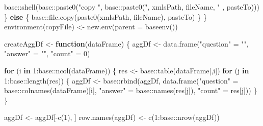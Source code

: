 \documentclass[
]{article}
\newenvironment{Shaded}{\begin{snugshade}}{\end{snugshade}}
\newcommand{\AttributeTok}[1]{\textcolor[rgb]{0.77,0.63,0.00}{#1}}
\newcommand{\ControlFlowTok}[1]{\textcolor[rgb]{0.13,0.29,0.53}{\textbf{#1}}}
\newcommand{\DecValTok}[1]{\textcolor[rgb]{0.00,0.00,0.81}{#1}}
\newcommand{\FunctionTok}[1]{\textcolor[rgb]{0.00,0.00,0.00}{#1}}
\newcommand{\NormalTok}[1]{#1}
\newcommand{\OtherTok}[1]{\textcolor[rgb]{0.56,0.35,0.01}{#1}}
\newcommand{\SpecialCharTok}[1]{\textcolor[rgb]{0.00,0.00,0.00}{#1}}
\newcommand{\StringTok}[1]{\textcolor[rgb]{0.31,0.60,0.02}{#1}}
\begin{document}
\begin{Shaded}
\begin{Highlighting}[]
\NormalTok{    base}\SpecialCharTok{::}\FunctionTok{shell}\NormalTok{(base}\SpecialCharTok{::}\FunctionTok{paste0}\NormalTok{(}\StringTok{"copy "}\NormalTok{, base}\SpecialCharTok{::}\FunctionTok{paste0}\NormalTok{(}\StringTok{\textquotesingle{}"\textquotesingle{}}\NormalTok{, xmlsPath, fileName, }\StringTok{\textquotesingle{}" \textquotesingle{}}\NormalTok{, pasteTo)))}
\NormalTok{  \} }\ControlFlowTok{else}\NormalTok{ \{}
\NormalTok{    base}\SpecialCharTok{::}\FunctionTok{file.copy}\NormalTok{(}\FunctionTok{paste0}\NormalTok{(xmlsPath, fileName), pasteTo)}
\NormalTok{  \}}
\NormalTok{\}}
\FunctionTok{environment}\NormalTok{(copyFile) }\OtherTok{\textless{}{-}} \FunctionTok{new.env}\NormalTok{(}\AttributeTok{parent =} \FunctionTok{baseenv}\NormalTok{())}

\NormalTok{createAggDf }\OtherTok{\textless{}{-}} \ControlFlowTok{function}\NormalTok{(dataFrame) \{}
\NormalTok{  aggDf }\OtherTok{\textless{}{-}} \FunctionTok{data.frame}\NormalTok{(}\StringTok{"question"} \OtherTok{=} \StringTok{""}\NormalTok{, }\StringTok{"answer"} \OtherTok{=} \StringTok{""}\NormalTok{, }\StringTok{"count"} \OtherTok{=} \DecValTok{0}\NormalTok{)}
  
  \ControlFlowTok{for}\NormalTok{ (i }\ControlFlowTok{in} \DecValTok{1}\SpecialCharTok{:}\NormalTok{base}\SpecialCharTok{::}\FunctionTok{ncol}\NormalTok{(dataFrame)) \{}
\NormalTok{    res }\OtherTok{\textless{}{-}}\NormalTok{ base}\SpecialCharTok{::}\FunctionTok{table}\NormalTok{(dataFrame[,i])}
    \ControlFlowTok{for}\NormalTok{ (j }\ControlFlowTok{in} \DecValTok{1}\SpecialCharTok{:}\NormalTok{base}\SpecialCharTok{::}\FunctionTok{length}\NormalTok{(res)) \{}
\NormalTok{      aggDf }\OtherTok{\textless{}{-}}\NormalTok{ base}\SpecialCharTok{::}\FunctionTok{rbind}\NormalTok{(aggDf, }\FunctionTok{data.frame}\NormalTok{(}\StringTok{"question"} \OtherTok{=}\NormalTok{ base}\SpecialCharTok{::}\FunctionTok{colnames}\NormalTok{(dataFrame)[i], }
                                             \StringTok{"answer"} \OtherTok{=}\NormalTok{ base}\SpecialCharTok{::}\FunctionTok{names}\NormalTok{(res[j]), }\StringTok{"count"} \OtherTok{=}\NormalTok{ res[j]))}
\NormalTok{    \}}
\NormalTok{  \}}
  
\NormalTok{  aggDf }\OtherTok{\textless{}{-}}\NormalTok{ aggDf[}\SpecialCharTok{{-}}\FunctionTok{c}\NormalTok{(}\DecValTok{1}\NormalTok{), ]}
  \FunctionTok{row.names}\NormalTok{(aggDf) }\OtherTok{\textless{}{-}} \FunctionTok{c}\NormalTok{(}\DecValTok{1}\SpecialCharTok{:}\NormalTok{base}\SpecialCharTok{::}\FunctionTok{nrow}\NormalTok{(aggDf))}
  

\end{Highlighting}
\end{Shaded}
\end{document}
